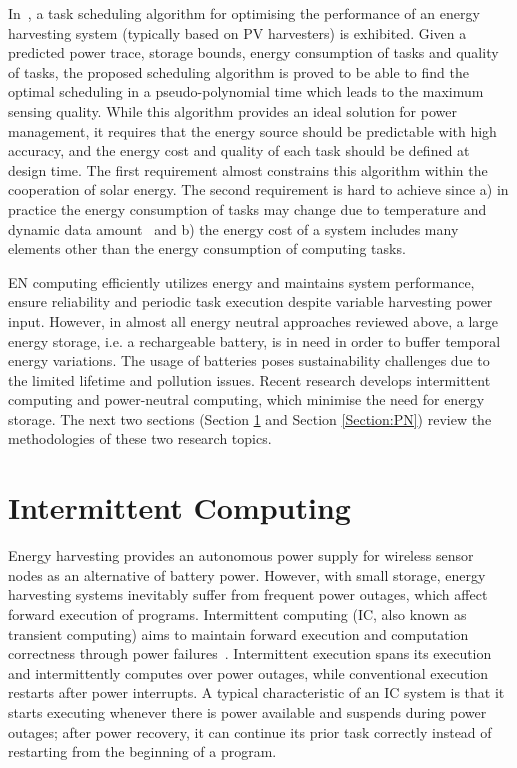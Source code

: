 In~\cite{caruso2018dynamic}, a task scheduling algorithm for optimising the performance of an energy harvesting system (typically based on PV harvesters) is exhibited. Given a predicted power trace, storage bounds, energy consumption of tasks and quality of tasks, the proposed scheduling algorithm is proved to be able to find the optimal scheduling in a pseudo-polynomial time which leads to the maximum sensing quality. While this algorithm provides an ideal solution for power management, it requires that the energy source should be predictable with high accuracy, and the energy cost and quality of each task should be defined at design time. The first requirement almost constrains this algorithm within the cooperation of solar energy. The second requirement is hard to achieve since a) in practice the energy consumption of tasks may change due to temperature and dynamic data amount~\cite{walker2016thermally} and b) the energy cost of a system includes many elements other than the energy consumption of computing tasks.

EN computing efficiently utilizes energy and maintains system performance, ensure reliability and periodic task execution despite variable harvesting power input. However, in almost all energy neutral approaches reviewed above, a large energy storage, i.e. a rechargeable battery, is in need in order to buffer temporal energy variations. The usage of batteries poses sustainability challenges due to the limited lifetime and pollution issues. Recent research develops intermittent computing and power-neutral computing, which minimise the need for energy storage. The next two sections (Section \ref{Section:IC} and Section \ref{Section:PN}) review the methodologies of these two research topics. 

\section{Intermittent Computing} \label{Section:IC}

Energy harvesting provides an autonomous power supply for wireless sensor nodes as an alternative of battery power. However, with small storage, energy harvesting systems inevitably suffer from frequent power outages, which affect forward execution of programs. Intermittent computing (IC, also known as transient computing) aims to maintain forward execution and computation correctness through power failures~\cite{ransford2012mementos}. Intermittent execution spans its execution and intermittently computes over power outages, while conventional execution restarts after power interrupts. A typical characteristic of an IC system is that it starts executing whenever there is power available and suspends during power outages; after power recovery, it can continue its prior task correctly instead of restarting from the beginning of a program. 

